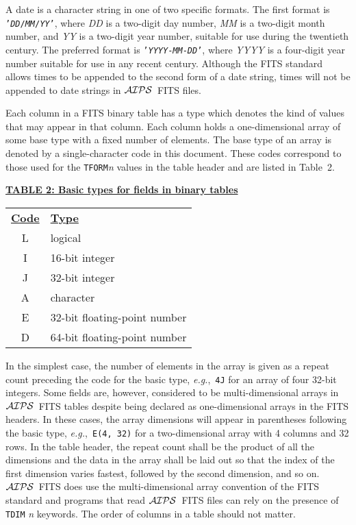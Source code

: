 \documentclass[twoside]{article}
\newcommand{\AIPS}{{$\cal AIPS\/$}}
\newcommand{\eg}{{\it e.g.},}
\begin{document}
A date is a character string in one of two specific formats.  The
first format is \hbox{\tt{'{\it DD\/}/{\it MM\/}/{\it YY\/}'}}, where
{\it DD} is a two-digit day number, {\it MM} is a two-digit month
number, and {\it YY} is a two-digit year number, suitable for use
during the twentieth century.  The preferred format is
\hbox{\tt{'{\it YYYY\/}-{\it MM\/}-{\it DD\/}'}}, where {\it YYYY} is
a four-digit year number suitable for use in any recent century.
Although the FITS standard allows times to be appended to the second
form of a date string, times will not be appended to date strings in
\AIPS\ FITS files.

Each column in a FITS binary table has a type which denotes the
kind of values that may appear in that column.  Each column holds
a one-dimensional array of some base type with a fixed number of
elements.  The base type of an array is denoted by a single-character
code in this document.  These codes correspond to those used for the
{\tt TFORM}{\it n} values in the table header and are listed in
Table~2.

\begin{center}
\underline{\bf{TABLE 2: Basic types for fields in binary tables}}\\
\begin{tabular}{cl}
\noalign{\vspace{2pt}} \label{ta:colcodes}
\underline{{\bf Code\vphantom{y}}} & \underline{\bf{Type}} \\
\noalign{\vspace{2pt}}
 L & logical \\
 I & 16-bit integer \\
 J & 32-bit integer \\
 A & character \\
 E & 32-bit floating-point number \\
 D & 64-bit floating-point number
\end{tabular}
\end{center}

In the simplest case, the number of elements in the array is given as
a repeat count preceding the code for the basic type, \eg\ {\tt 4J}
for an array of four 32-bit integers.  Some fields are, however,
considered to be multi-dimensional arrays in \AIPS\ FITS tables despite
being declared as one-dimensional arrays in the FITS headers.  In
these cases, the array dimensions will appear in parentheses following
the basic type, \eg\ {\tt E(4, 32)} for a two-dimensional array with 4
columns and 32 rows.  In the table header, the repeat count shall be
the product of all the dimensions and the data in the array shall be
laid out so that the index of the first dimension  varies fastest,
followed by the second dimension, and so on.  \AIPS\ FITS does use the
multi-dimensional array convention of the FITS standard and programs
that read \AIPS\ FITS files can rely on the presence of {\tt TDIM}{\it
  n} keywords.  The order of columns in a table should not matter.
\vfill\eject
\end{document}
